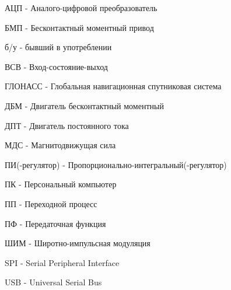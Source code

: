 \abb

\noindent
АЦП - Аналого-цифровой преобразователь

\noindent
БМП - Бесконтактный моментный привод

\noindent
б/у - бывший в употреблении

\noindent
ВСВ - Вход-состояние-выход

\noindent
ГЛОНАСС - Глобальная навигационная спутниковая система

\noindent
ДБМ - Двигатель бесконтактный моментный

\noindent
ДПТ - Двигатель постоянного тока

\noindent
МДС - Магнитодвижущая сила

\noindent
ПИ(-регулятор) - Пропорционально-интегральный(-регулятор)

\noindent
ПК - Персональный компьютер

\noindent
ПП - Переходной процесс

\noindent
ПФ - Передаточная функция

\noindent
ШИМ - Широтно-импульсная модуляция

\noindent
SPI - Serial Peripheral Interface

\noindent
USB - Universal Serial Bus